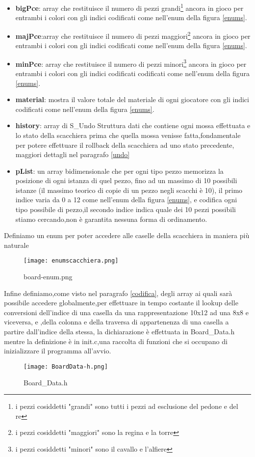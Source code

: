\begin{itemize}
    \item \textbf{bigPce}: array che restituisce il numero di pezzi grandi\footnote{i pezzi cosiddetti "grandi" sono tutti i pezzi ad esclusione del pedone e del re} ancora in gioco  per entrambi i colori con gli indici codificati  come nell'enum della figura \ref{enums}.
    \item \textbf{majPce}:array che restituisce il numero di pezzi maggiori\footnote{i pezzi cosiddetti "maggiori" sono la regina e la torre} ancora in gioco  per entrambi i colori con gli indici codificati come nell'enum della figura \ref{enums}.
    \item \textbf{minPce}: array che restituisce il numero di pezzi minori\footnote{i pezzi cosiddetti "minori" sono il cavallo e l'alfiere} ancora in gioco  per entrambi i colori con gli indici codificati codificati come nell'enum della figura \ref{enums}.
    \item \textbf{material}: mostra il valore totale del materiale di ogni giocatore con gli indici codificati  come nell'enum della figura \ref{enums}.
    \item \textbf{history}: array di S\_Undo Struttura dati che contiene ogni mossa effettuata e lo stato della scacchiera prima che quella mossa venisse fatta,fondamentale per potere effettuare
          il rollback della scacchiera ad uno stato precedente, maggiori dettagli nel paragrafo \ref{undo}
    \item \textbf{pList}: un array bidimensionale  che per ogni tipo  pezzo memorizza la posizione di ogni istanza di quel pezzo, fino ad un massimo di 10 possibili istanze (il massimo teorico di copie di un pezzo negli scacchi è 10),
          il primo indice varia da 0 a 12 come nell'enum della figura \ref{enums}, e codifica ogni tipo possibile di pezzo,il secondo indice indica quale dei 10 pezzi possibili stiamo cercando,non è garantita nessuna forma
          di ordinamento.
\end{itemize}

Definiamo un enum per poter accedere alle caselle della scacchiera in maniera più naturale
\begin{figure}[H]
    \centering
    \texttt{[image: enumscacchiera.png]}
    \caption{ board-enum.png}
    \label{boardenum}
\end{figure}

Infine definiamo,come visto nel paragrafo \ref{codifica}, degli array ai quali sarà possibile accedere globalmente,per effettuare in tempo costante il lookup delle conversioni dell'indice di una casella
da una rappresentazione 10x12 ad una 8x8 e viceversa, e ,della colonna e della traversa di appartenenza di una casella a partire dall'indice della stessa, la dichiarazione è effettuata in Board\_Data.h mentre la definizione
è in init.c,una raccolta di funzioni che si occupano di inizializzare il programma all'avvio.
\begin{figure}[H]
    \centering
    \begin{minipage}[H]{0.8\textwidth}
        \texttt{[image: BoardData-h.png]}
        \caption{Board\_Data.h}
    \end{minipage}
\end{figure}


